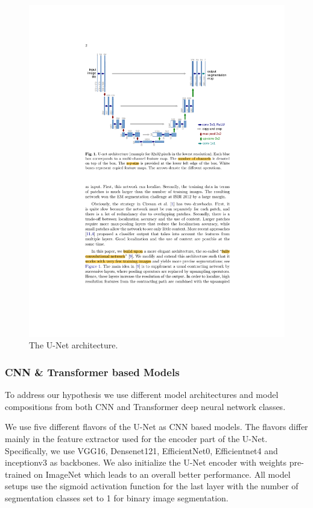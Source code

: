 \begin{figure}[ht]
  \centering
  \includegraphics[width=\columnwidth]{assets/u_net.pdf}
  \caption[Lesion Images]
  {The U-Net architecture.}
  \label{u_net}
\end{figure}



\subsubsection{CNN \& Transformer based Models}

To address our hypothesis we use different model architectures and model compositions from both CNN and Transformer deep neural network classes.

\par
We use five different flavors of the U-Net as CNN based models. The flavors differ mainly in the feature extractor used for the encoder part of the U-Net. Specifically, we use VGG16, Densenet121, EfficientNet0, Efficientnet4 and inceptionv3 as backbones. We also initialize the U-Net encoder with weights pre-trained on ImageNet which leads to an overall better performance. All model setups use the sigmoid activation function for the last layer with the number of segmentation classes set to 1  for binary image segmentation.

